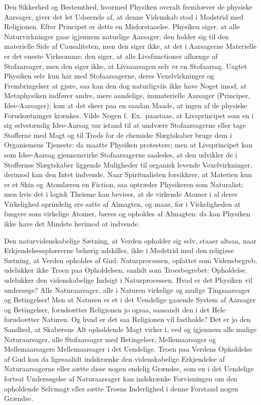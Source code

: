 \documentclass[12pt]{book}
\begin{document}
Den Sikkerhed og Bestemthed, hvormed Physiken overalt fremhæver de
physiske Aarsager, giver det let Udseende af, at denne Videnskab
stod i Modstrid med Religionen. Efter Principet er dette en
Misforstaaelse. Physiken siger, at alle Naturvirkninger gaae
igjennem naturlige Aarsager; den holder sig til den materielle Side
af Causaliteten, men den siger ikke, at det i Aarsagerne Materielle
er det eneste Virksomme; den siger, at alle Livsfunctioner afhænge
af Stofaarsager, men den siger ikke, at Livsaarsagen selv er en
Stofaarsag. Uagtet Physiken selv kun har med Stofaarsagerne, deres
Vexelvirkninger og Frembringelser at gjøre, saa kan den dog
naturligviis ikke have Noget imod, at Metaphysiken indfører andre,
mere aandelige, immaterielle Aarsager (Principer, Idee-Aarsager);
kun at det skeer paa en saadan Maade, at
ingen af de physiske Forudsætninger krænkes. Vilde Nogen f.\ Ex.\
paastaae, at Livsprincipet som en i sig selvstændig Idee-Aarsag var
istand til at undvære Stofaarsagerne eller tage Stofferne med Magt
og til Trods for de chemiske Slægtskaber bruge dem i Organismens
Tjeneste: da maatte Physiken protestere; men at Livsprincipet kan
som Idee-Aarsag gjennemvirke Stofaarsagerne saaledes, at den udvikler
de i Stoffernes Slægtskaber liggende Muligheder til organisk levende
Vexelvirkninger, derimod kan den Intet indvende. Naar Spiritualisten
forsikkrer, at Materien kun er et Skin og Atomlæren en Fiction, saa
optræder Physikeren som Naturalist; men hvis det i logisk Theisme
kan bevises, at de virkende Atomer i al deres Virkelighed
oprindelig ere satte af Almagten, og maae, for i Virkeligheden at
fungere som virkelige Atomer, bæres og opholdes af Almagten: da kan
Physiken ikke have det Mindste herimod at indvende.

Den naturvidenskabelige Sætning, at Verden opholder sig selv, staaer
altsaa, naar Erkjendelsessphærerne behørig adskilles, ikke i
Modstrid med den religiøse Sætning, at Verden opholdes af Gud:
Naturprocessen, opfattet som Vidensbegreb, udelukker ikke Troen paa
Opholdelsen, saalidt som Troesbegrebet: Opholdelse, udelukker den
videnskabelige Indsigt i Naturprocessen. Hvad er det Physiken vil
undersøge? Alle Naturaarsager, alle i Naturen virkelige og mulige
Tingsaarsager og Betingelser! Men at Naturen er et i det Uendelige
gaaende System af Aarsager og Betingelser, forudsætter Religionen jo
ogsaa, saasandt den i det Hele forudsætter Naturen. Og hvad er det
saa Religionen vil fastholde? Det er jo den Sandhed, at Skaberens
Alt opholdende Magt virker i, ved og igjennem alle mulige
Naturaarsager, alle Stofaarsager med Betingelser, Mellemaarsager og
Mellemaarsagers Mellemaarsager i det Uendelige. Troen paa Verdens
Opholdelse af Gud kan da ligesaalidt indskrænke den videnskabelige
Erkjendelse af Naturaarsagerne eller sætte disse nogen endelig
Grændse, som en i det Uendelige fortsat Undersøgelse af
Naturaarsager kan indskrænke Forvisningen om den opholdende Selvmagt
eller sætte Troens Inderlighed i denne Forstand nogen Grændse.
\end{document}
